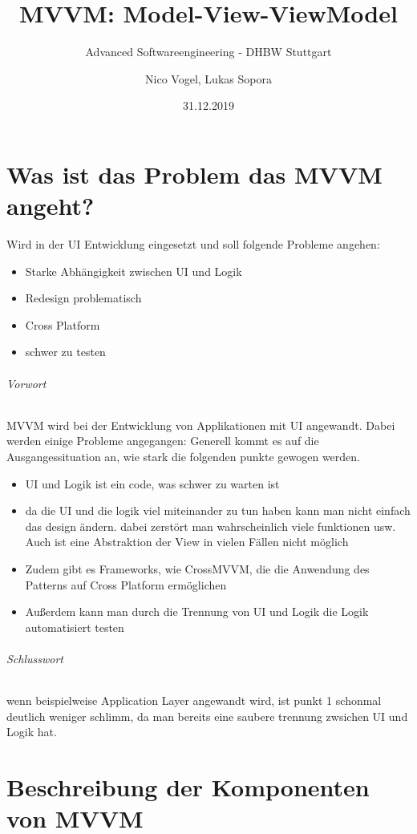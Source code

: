 \documentclass[titlepage=false,12pt]{scrreprt}
\title{MVVM: Model-View-ViewModel}
\subtitle{Advanced Softwareengineering - DHBW Stuttgart}
\author{Nico Vogel, Lukas Sopora}
\date{31.12.2019}
\begin{document}
\maketitle
	
{\renewcommand\clearpage\relax
	\tableofcontents}
\newpage

\chapter{Was ist das Problem das MVVM angeht?}
	
Wird in der UI Entwicklung eingesetzt und soll folgende Probleme angehen:
	
\begin{itemize}
	\item Starke Abhängigkeit zwischen UI und Logik
	\item Redesign problematisch
	\item Cross Platform
	\item schwer zu testen
\end{itemize}

\subparagraph{Vorwort}


MVVM wird bei der Entwicklung von Applikationen mit UI angewandt.
Dabei werden einige Probleme angegangen:
Generell kommt es auf die Ausgangessituation an, wie stark die folgenden punkte gewogen werden.

\begin{itemize}
	\item UI und Logik ist ein code, was schwer zu warten ist 
	\item da die UI und die logik viel miteinander zu tun haben kann man nicht einfach das design ändern. dabei zerstört      man wahrscheinlich viele funktionen usw.
	      Auch ist eine Abstraktion der View in vielen Fällen nicht möglich
	\item Zudem gibt es Frameworks, wie CrossMVVM, die die Anwendung des Patterns auf Cross Platform ermöglichen
	\item Außerdem kann man durch die Trennung von UI und Logik die Logik automatisiert testen
\end{itemize}
\subparagraph{Schlusswort}
wenn beispielweise Application Layer angewandt wird, ist punkt 1 schonmal deutlich weniger schlimm, da man bereits eine saubere trennung zwsichen UI und Logik hat.

\chapter{Beschreibung der Komponenten von MVVM}
\end{document}
